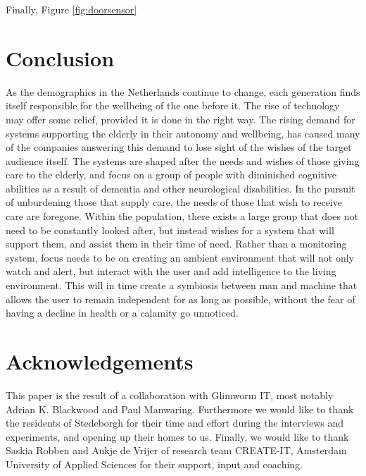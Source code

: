 \documentclass{below-ext}
\begin{document}
Finally, Figure \ref{fig:doorsensor} 



\section{Conclusion}
As the demographics in the Netherlands continue to change, each generation finds itself responsible for the wellbeing of the one before it. The rise of technology may offer some relief, provided it is done in the right way. The rising demand for systems supporting the elderly in their autonomy and wellbeing, has caused many of the companies answering this demand to lose sight of the wishes of the target audience itself. The systems are shaped after the needs and wishes of those giving care to the elderly, and focus on a group of people with diminished cognitive abilities as a result of dementia and other neurological disabilities. In the pursuit of unburdening those that supply care, the needs of those that wish to receive care are foregone. Within the population, there exists a large group that does not need to be constantly looked after, but instead wishes for a system that will support them, and assist them in their time of need. Rather than a monitoring system, focus needs to be on creating an ambient environment that will not only watch and alert, but interact with the user and add intelligence to the living environment. This will in time create a symbiosis between man and machine that allows the user to remain independent for as long as possible, without the fear of having a decline in health or a calamity go unnoticed.

\section{Acknowledgements}

This paper is the result of a collaboration with Glimworm IT, most notably Adrian K. Blackwood and Paul Manwaring. Furthermore we would like to thank the residents of Stedeborgh for their time and effort during the interviews and experiments, and opening up their homes to us. Finally, we would like to thank Saskia Robben and Aukje de Vrijer of research team CREATE-IT, Amsterdam University of Applied Sciences for their support, input and coaching.

\balance


\end{document}
